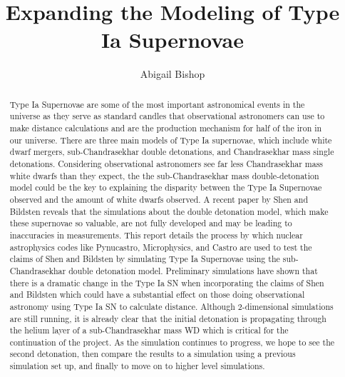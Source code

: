 \documentclass[preprint]{aastex62}
\begin{document}
\title{Expanding the Modeling of Type Ia Supernovae}
\author{Abigail Bishop}

  

\begin{abstract}
  
  Type Ia Supernovae are some of the most important astronomical events in the universe as they serve as standard candles that observational astronomers can use to make distance calculations and are the production mechanism for half of the iron in our universe. There are three main models of Type Ia supernovae, which include white dwarf mergers, sub-Chandrasekhar double detonations, and Chandrasekhar mass single detonations. Considering observational astronomers see far less Chandrasekhar mass white dwarfs than they expect, the the sub-Chandrasekhar mass double-detonation model could be the key to explaining the disparity between the Type Ia Supernovae observed and the amount of white dwarfs observed.  A recent paper by Shen and Bildsten reveals that the simulations about the double detonation model, which make these supernovae so valuable, are not fully developed and may be leading to inaccuracies in measurements. This report details the process by which nuclear astrophysics codes like Pynucastro, Microphysics, and Castro are used to test the claims of Shen and Bildsten by simulating Type Ia Supernovae using the sub-Chandrasekhar double detonation model. Preliminary simulations have shown that there is a dramatic change in the Type Ia SN when incorporating the claims of Shen and Bildsten which could have a substantial effect on those doing observational astronomy using Type Ia SN to calculate distance. Although 2-dimensional simulations are still running, it is already clear that the initial detonation is propagating through the helium layer of a sub-Chandrasekhar mass WD which is critical for the continuation of the project. As the simulation continues to progress, we hope to see the second detonation, then compare the results to a simulation using a previous simulation set up, and finally to move on to higher level simulations. 

\end{abstract}
\end{document}
